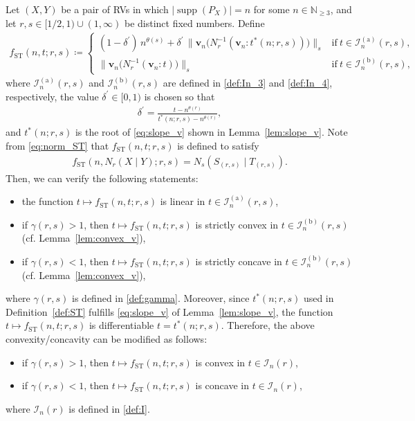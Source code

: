 \documentclass[conference, draftcls, onecolumn]{IEEEtran}
\theoremstyle{plain}
\newcommand{\bvec}[1]{\boldsymbol{#1}}
\newcommand{\supp}{\operatorname{supp}}
\newcommand{\lemref}[1]{Lemma~\ref{#1}}
\newcommand{\thref}[1]{Theorem~\ref{#1}}
\newcommand{\defref}[1]{Definition~\ref{#1}}
\begin{document}
\begin{IEEEproof}[Proof of \thref{th:ST}]
Let $(X, Y)$ be a pair of RVs in which $|\!\supp( P_{X} )| = n$ for some $n \in \mathbb{N}_{\ge 3}$, and let $r, s \in [1/2, 1) \cup (1, \infty)$ be distinct fixed numbers.
Define
\begin{align}
f_{\mathrm{ST}}(n, t; r, s)
\coloneqq
\begin{cases}
(1-\delta^{\prime}) \, n^{\theta( s )} + \delta^{\prime} \, \big\| \bvec{v}_{n}\big( N_{r}^{-1}( \bvec{v}_{n} : t^{\ast}(n; r, s) ) \big) \big\|_{s}
& \mathrm{if} \ t \in \mathcal{I}_{n}^{(\mathrm{a})}( r, s ) ,
\\
\big\| \bvec{v}_{n}\big( N_{r}^{-1}( \bvec{v}_{n} : t ) \big) \big\|_{s}
& \mathrm{if} \ t \in \mathcal{I}_{n}^{(\mathrm{b})}( r, s ) ,
\end{cases}
\label{def:fST}
\end{align}
where $\mathcal{I}_{n}^{(\mathrm{a})}( r, s )$ and $\mathcal{I}_{n}^{(\mathrm{b})}( r, s )$ are defined in \eqref{def:In_3} and \eqref{def:In_4}, respectively, the value $\delta^{\prime} \in [0, 1)$ is chosen so that
\begin{align}
\delta^{\prime}
=
\frac{ t - n^{\theta( r )} }{ t^{\ast}(n; r, s) - n^{\theta( r )} } ,
\end{align}
and $t^{\ast}(n; r, s)$ is the root of \eqref{eq:slope_v} shown in \lemref{lem:slope_v}.
Note from \eqref{eq:norm_ST} that $f_{\mathrm{ST}}(n, t; r, s)$ is defined to satisfy
\begin{align}
f_{\mathrm{ST}}(n, N_{r}(X \mid Y); r, s)
=
N_{s}(S_{(r, s)} \mid T_{(r, s)}) .
\label{eq:fST_ST}
\end{align}
Then, we can verify the following statements:
\begin{itemize}
\item
the function $t \mapsto f_{\mathrm{ST}}(n, t; r, s)$ is linear in $t \in \mathcal{I}_{n}^{(\mathrm{a})}( r, s )$,
\item
if $\gamma( r, s ) > 1$, then $t \mapsto f_{\mathrm{ST}}(n, t; r, s)$ is strictly convex in $t \in \mathcal{I}_{n}^{(\mathrm{b})}( r, s )$ (cf. \lemref{lem:convex_v}),
\item
if $\gamma( r, s ) < 1$, then $t \mapsto f_{\mathrm{ST}}(n, t; r, s)$ is strictly concave in $t \in \mathcal{I}_{n}^{(\mathrm{b})}( r, s )$ (cf. \lemref{lem:convex_v}),
\end{itemize}
where $\gamma( r, s )$ is defined in \eqref{def:gamma}.
Moreover, since $t^{\ast}(n; r, s)$ used in \defref{def:ST} fulfills \eqref{eq:slope_v} of \lemref{lem:slope_v}, the function $t \mapsto f_{\mathrm{ST}}(n, t; r, s)$ is differentiable $t = t^{\ast}(n; r, s)$.
Therefore, the above convexity/concavity can be modified as follows:
\begin{itemize}
\item
if $\gamma( r, s ) > 1$, then $t \mapsto f_{\mathrm{ST}}(n, t; r, s)$ is convex in $t \in \mathcal{I}_{n}( r )$,
\item
if $\gamma( r, s ) < 1$, then $t \mapsto f_{\mathrm{ST}}(n, t; r, s)$ is concave in $t \in \mathcal{I}_{n}( r )$,
\end{itemize}
where $\mathcal{I}_{n}( r )$ is defined in \eqref{def:I}.


\end{IEEEproof}
\end{document}
